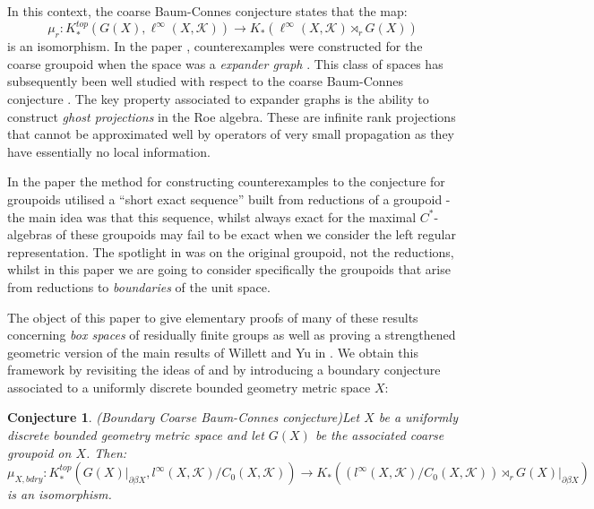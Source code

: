 \documentclass[11pt]{amsart}
\theoremstyle{plain}
\newtheorem{conjecture}[theorem]{Conjecture}
\theoremstyle{definition}%
\theoremstyle{remark}%
\begin{document}
In this context, the coarse Baum-Connes conjecture states that the map:
\begin{equation*}
\mu_{r}:K_{*}^{top}(G(X), \ell^{\infty}(X,\mathcal{K})) \rightarrow K_{*}(\ell^{\infty}(X,\mathcal{K})\rtimes_{r}G(X))
\end{equation*}
is an isomorphism. In the paper \cite{MR1911663}, counterexamples were constructed for the coarse groupoid when the space was a \textit{expander graph} \cite{MR2569682}. This class of spaces has subsequently been well studied with respect to the coarse Baum-Connes conjecture \cite{higsonpreprint,MR2431253,MR2419930,MR2764895,MR2568691,explg1,explg2}. The key property associated to expander graphs is the ability to construct \textit{ghost projections} in the Roe algebra. These are infinite rank projections that cannot be approximated well by operators of very small propagation as they have essentially no local information. 

In the paper \cite{MR1911663} the method for constructing counterexamples to the conjecture for groupoids utilised a ``short exact sequence'' built from reductions of a groupoid -the main idea was that this sequence, whilst always exact for the maximal $C^{*}$-algebras of these groupoids may fail to be exact when we consider the left regular representation. The spotlight in \cite{MR1911663} was on the original groupoid, not the reductions, whilst in this paper we are going to consider specifically the groupoids that arise from reductions to \textit{boundaries} of the unit space. 

The object of this paper to give elementary proofs of many of these results concerning \textit{box spaces} of residually finite groups as well as proving a strengthened geometric version of the main results of Willett and Yu in \cite{explg1,explg2}. We obtain this framework by revisiting the ideas of \cite{MR1911663,MR1905840} and by introducing a boundary conjecture associated to a uniformly discrete bounded geometry metric space $X$:
\begin{conjecture}(Boundary Coarse Baum-Connes conjecture)\label{MC:S1}
Let $X$ be a uniformly discrete bounded geometry metric space and let $G(X)$ be the associated coarse groupoid on $X$. Then:
\begin{equation*}
\mu_{X,bdry}:K_{*}^{top}(G(X)|_{\partial\beta X}, l^{\infty}(X,\mathcal{K})/C_{0}(X,\mathcal{K})) \rightarrow K_{*}((l^{\infty}(X,\mathcal{K})/C_{0}(X,\mathcal{K}))\rtimes_{r}G(X)|_{\partial\beta X})
\end{equation*}
is an isomorphism.
\end{conjecture}
\end{document}
